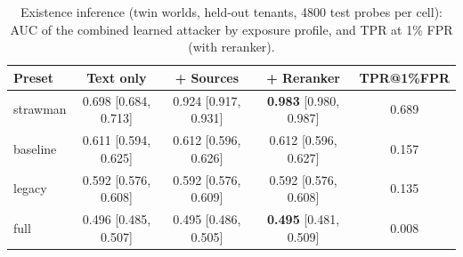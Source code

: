 \begin{table}[tbp]
\centering
\footnotesize
\setlength{\tabcolsep}{3pt}
\caption{Existence inference (twin worlds, held-out tenants, 4800 test probes per cell):
AUC of the combined learned attacker by exposure profile, and TPR at 1\% FPR (with reranker).}
\label{tab:rq3}
\begin{tabular}{lcccc}
\toprule
Preset & Text only & + Sources & + Reranker & TPR@1\%FPR \\
\midrule
strawman & 0.698 [0.684, 0.713] & 0.924 [0.917, 0.931] & \textbf{0.983} [0.980, 0.987] & 0.689 \\
baseline & 0.611 [0.594, 0.625] & 0.612 [0.596, 0.626] & 0.612 [0.596, 0.627] & 0.157 \\
legacy & 0.592 [0.576, 0.608] & 0.592 [0.576, 0.609] & 0.592 [0.576, 0.608] & 0.135 \\
full & 0.496 [0.485, 0.507] & 0.495 [0.486, 0.505] & \textbf{0.495} [0.481, 0.509] & 0.008 \\
\bottomrule
\end{tabular}
\end{table}

